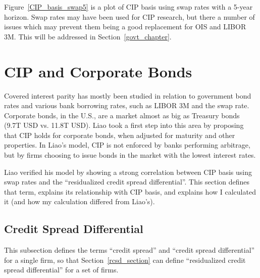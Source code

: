 Figure~\ref{CIP_basis_swap5} is a plot of CIP basis using swap rates with a 5-year horizon.  Swap rates may have been used for CIP research, but there a number of issues which may prevent them being a good replacement for OIS and LIBOR 3M.  This will be addressed in Section~\ref{govt_chapter}.



 


\section{CIP and Corporate Bonds} \label{Liao_chapter}

Covered interest parity has mostly been studied in relation to government bond rates and various bank borrowing rates, such as LIBOR 3M and the swap rate.  Corporate bonds, in the U.S., are a market almost as big as Treasury bonds (9.7T USD vs. 11.8T USD).  Liao\cite{Liao2016} took a first step into this area by proposing that CIP holds for corporate bonds, when adjusted for maturity and other properties.  In Liao's model, CIP is not enforced by banks performing arbitrage, but by firms choosing to issue bonds in the market with the lowest interest rates.

Liao verified his model by showing a strong correlation between CIP basis using swap rates and the ``residualized credit spread differential''.  This section defines that term, explains its relationship with CIP basis, and explains how I calculated it (and how my calculation differed from Liao's).

\subsection{Credit Spread Differential}

This subsection defines the terms ``credit spread'' and ``credit spread differential'' for a single firm, so that Section~\ref{rcsd_section} can define ``residualized credit spread differential'' for a set of firms.  

